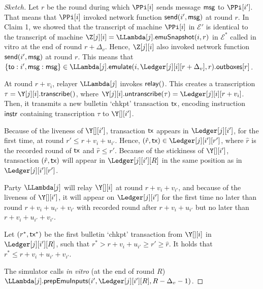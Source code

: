 \begin{proof}[Sketch]
  Let $r$ be the round during which $\PPi[i]$ sends message $\textsf{msg}$ to $\PPi[i']$.
  That means that $\PPi[i]$ invoked network function $\textsf{send}(i', \textsf{msg})$ at round $r$.
  In Claim 1, we showed that the transcript of machine $\PPi[i]$ in $\mathcal{E}'$
  is identical to the transcript of machine $\Z[j][i] = \LLambda[j].\emulationSnapshot(i,r)$ in $\mathcal{E}^*$
  called in vitro at the end of round $r + \Delta_v$.
  Hence, $\Z[j][i]$ also invoked network function $\textsf{send}(i', \textsf{msg})$ at round $r$.
  This means that $\{\textsf{to}: i', \msg: \msg\} \in \LLambda[j].\emulate(i, \Ledger[j][i][r + \Delta_v], r).\outboxes[r]$.




  At round $r + v_i$, relayer $\LLambda[j]$ invokes $\textsf{relay}()$.
  This creates a transcription $\tau = \Y[j][i].\transcribe()$, where
  $\Y[j][i].\untranscribe(\tau) = \Ledger[j][i][r + v_i]$.
  Then, it transmits a new bulletin `chkpt'
  transaction $\textsf{tx}$, encoding instruction $\textsf{instr}$ containing transcription $\tau$ to $\Y[][i']$.

  Because of the liveness of $\Y[][i']$,
  transaction $\textsf{tx}$ appears in $\Ledger[j][i']$, for the first time,
  at round $r' \leq r + v_i + u_{i'}$.
  Hence, $(\hat{r}, \tx) \in \Ledger[j][i'][r']$, where $\hat{r}$ is the recorded round of $\textsf{tx}$
  and $\hat{r} \leq r'$. Because of the stickiness of $\Y[][i']$, transaction $(\hat{r}, \textsf{tx})$ will
  appear in $\Ledger[j][i'][R]$ in the same position as in $\Ledger[j][i'][r']$.

  Party $\LLambda[j]$ will relay $\Y[][i]$ at round $r + v_i + v_{i'}$, and
  because of the liveness of $\Y[][i']$, it will appear on $\Ledger[j][i']$ for the
  first time no later than round $r + v_i + u_{i'} + v_{i'}$ with recorded round
  after $r + v_i + u_{i'}$ but no later than $r + v_i + u_{i'} + v_{i'}$.

  Let $(r^*, \textsf{tx}^*)$ be the first bulletin `chkpt' transaction from $\Y[][i]$ in $\Ledger[j][i'][R]$, such that
  $r^* > r + v_{i} + u_{i'} \geq r' \geq \hat{r}$. It holds that $r^* \leq r + v_{i} + u_{i'} + v_{i'}$.

  The simulator calls \emph{in vitro} (at the end of round $R$)
  $\LLambda[j].\prepareEmulationInputs(i', \Ledger[j][i'][R], R - \Delta_v - 1)$.


\end{proof}
